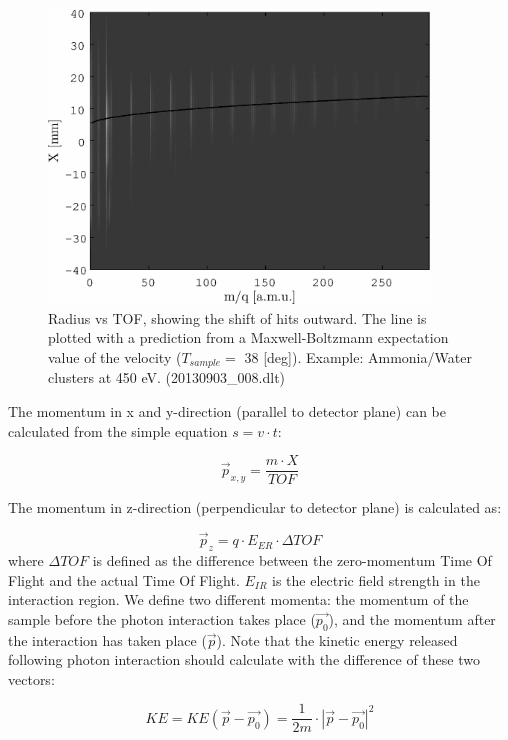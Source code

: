\begin{figure}[H]
   \centering
    \centerline{\includegraphics[width=0.9\textwidth]{Graphics/p_0_subtraction_before.eps}}
\caption{Radius vs TOF, showing the shift of hits outward. The line is plotted with a prediction from a Maxwell-Boltzmann expectation value of the velocity ($T_{sample} = $ 38 [deg]). Example: Ammonia/Water clusters at 450 eV. (20130903\_008.dlt)}
\end{figure}

The momentum in x and y-direction (parallel to detector plane) can be calculated from the simple equation $s = v \cdot t$:

\begin{equation}
\vec{p}_{x, y} =  \frac{m \cdot X}{TOF}
\end{equation}

The momentum in z-direction (perpendicular to detector plane) is calculated as:

\begin{equation}
\vec{p}_{z} = q \cdot E_{ER} \cdot \Delta TOF
\label{p_z_2_TOF}
\end{equation}
where $\Delta TOF$ is defined as the difference between the zero-momentum Time Of Flight and the actual Time Of Flight. $E_{IR}$ is the electric field strength in the interaction region.
We define two different momenta: the momentum of the sample before the photon interaction takes place ($\vec{p_0}$), and the momentum after the interaction has taken place ($\vec{p}$). Note that the kinetic energy released following photon interaction should calculate with the difference of these two vectors:

\begin{equation}
KE = KE(\vec{p} - \vec{p_0}) = \frac{1}{2 m} \cdot |{\vec{p} - \vec{p_0}}|^2
\end{equation}

